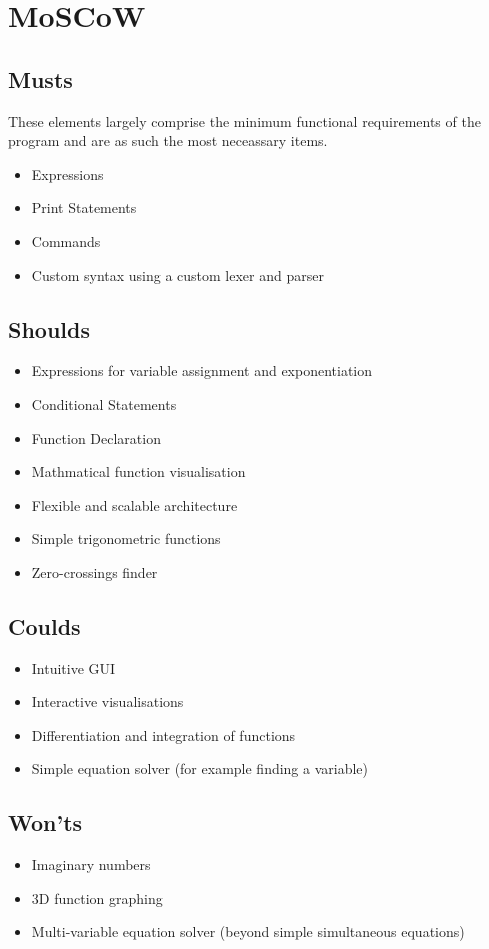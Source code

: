 \documentclass[a4paper, oneside, 11pt]{report}
\begin{document}
\section{MoSCoW}
\subsection{Musts}

These elements largely comprise the minimum functional requirements of the program and are as such the most neceassary items.
\begin{itemize}
	\item Expressions
	\item Print Statements
	\item Commands
	\item Custom syntax using a custom lexer and parser
\end{itemize}

\subsection{Shoulds}

\begin{itemize}
	\item Expressions for variable assignment and exponentiation
	\item Conditional Statements
	\item Function Declaration
	\item Mathmatical function visualisation
	\item Flexible and scalable architecture
	\item Simple trigonometric functions
	\item Zero-crossings finder
\end{itemize}

\subsection{Coulds}
\begin{itemize}
	\item Intuitive GUI
	\item Interactive visualisations
	\item Differentiation and integration of functions
	\item Simple equation solver (for example finding a variable)
\end{itemize}

\subsection{Won'ts}
\begin{itemize}
	\item Imaginary numbers
	\item 3D function graphing
	\item Multi-variable equation solver (beyond simple simultaneous equations)
\end{itemize}
\end{document}
